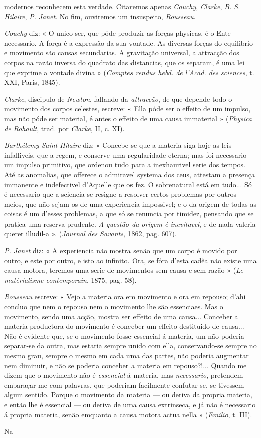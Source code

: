 modernos reconhecem esta verdade. Citaremos apenas \emph{Couchy}, \emph{Clarke}, \emph{B. S. Hilaire}, \emph{P. Janet}. No fim, ouviremos um insuspeito, \emph{Rousseau}.\par \emph{Couchy} diz: « O unico ser, que póde produzir as forças physicas, é o Ente necessario. A força é a expressão da sua vontade. As diversas forças do equilibrio e movimento são causas secundarias. A gravitação universal, a attracção dos corpos na razão inversa do quadrato das distancias, que os separam, é uma lei que exprime a vontade divina » (\emph{Comptes rendus hebd. de l'Acad. des sciences}, t. XXI, Paris, 1845).\par \emph{Clarke}, discipulo de \emph{Newton}, fallando da \emph{attracção}, de que depende todo o movimento dos corpos celestes, escreve: « Ella póde ser o effeito de um impulso, mas não póde ser material, é antes o effeito de uma causa immaterial » (\emph{Physica de Rohault}, trad. por \emph{Clarke}, II, c. XI).\par \emph{Barthélemy Saint-Hilaire} diz: « Concebe-se que a materia siga hoje as leis infalliveis, que a regem, e conserve uma regularidade eterna; mas foi necessario um impulso primitivo, que ordenou tudo para a inexhaurivel serie dos tempos. Até as anomalias, que offerece o admiravel systema dos ceus, attestam a presença immanente e indefectivel d'Aquelle que os fez. O sobrenatural está em tudo... Só é necessario que a sciencia se resigne a resolver certos problemas por outros meios, que não sejam os de uma experiencia impossivel; e o da origem de todas as coisas é um d'esses problemas, a que só se renuncia por timidez, pensando que se pratica uma reserva prudente. \emph{A questão da origem é inevitavel}, e de nada valeria querer illudil-a ». (\emph{Journal des Savants}, 1862, pag. 607).\par \emph{P. Janet} diz: « A experiencia não mostra senão que um corpo é movido por outro, e este por outro, e isto ao infinito. Ora, se fóra d'esta cadêa não existe uma causa motora, teremos uma serie de movimentos sem causa e sem razão » (\emph{Le matérialisme contemporain}, 1875, pag. 58).\par \emph{Rousseau} escreve: « Vejo a materia ora em movimento e ora em repouso; d'ahi concluo que nem o repouso nem o movimento lhe são essenciaes. Mas o movimento, sendo uma acção, mostra ser effeito de uma causa... Conceber a materia productora do movimento é conceber um effeito destituido de causa... Não é evidente que, se o movimento fosse essencial á materia, um não poderia separar-se da outra, mas estaria sempre unido com ella, conservando-se sempre no mesmo grau, sempre o mesmo em cada uma das partes, não poderia augmentar nem diminuir, e não se poderia conceber a materia em repouso?!... Quando me dizem que o movimento não é \emph{essencial} á materia, mas \emph{necessario}, pretendem embaraçar-me com palavras, que poderiam facilmente confutar-se, se tivessem algum sentido. Porque o movimento da materia --- ou deriva da propria materia, e então lhe é essencial --- ou deriva de uma causa extrinseca, e já não é necessario á propria materia, senão emquanto a causa motora actua nella » (\emph{Emilio}, t. III).\par Na 
